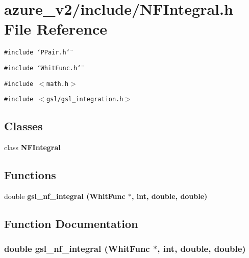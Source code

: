 \section{azure\_\-v2/include/NFIntegral.h File Reference}
\label{NFIntegral_8h}
{\tt \#include \char`\"{}PPair.h\char`\"{}}\par
{\tt \#include \char`\"{}Whit\-Func.h\char`\"{}}\par
{\tt \#include $<$math.h$>$}\par
{\tt \#include $<$gsl/gsl\_\-integration.h$>$}\par
\subsection*{Classes}
\begin{CompactItemize}
\item 
class \bf{NFIntegral}
\end{CompactItemize}
\subsection*{Functions}
\begin{CompactItemize}
\item 
double \bf{gsl\_\-nf\_\-integral} (\bf{Whit\-Func} $\ast$, int, double, double)
\end{CompactItemize}


\subsection{Function Documentation}
\subsubsection{\setlength{\rightskip}{0pt plus 5cm}double gsl\_\-nf\_\-integral (\bf{Whit\-Func} $\ast$, int, double, double)}\label{NFIntegral_8h_41a2627712939f4a4b6df6ba88520f20}


